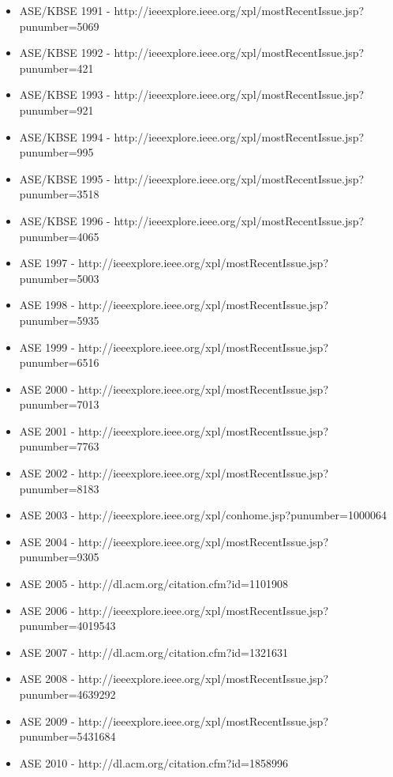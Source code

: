 \begin{itemize}
  \item ASE/KBSE 1991 - {\small http://ieeexplore.ieee.org/xpl/mostRecentIssue.jsp?punumber=5069}
  \item ASE/KBSE 1992 - {\small http://ieeexplore.ieee.org/xpl/mostRecentIssue.jsp?punumber=421}
  \item ASE/KBSE 1993 - {\small http://ieeexplore.ieee.org/xpl/mostRecentIssue.jsp?punumber=921}
  \item ASE/KBSE 1994 - {\small http://ieeexplore.ieee.org/xpl/mostRecentIssue.jsp?punumber=995}
  \item ASE/KBSE 1995 - {\small http://ieeexplore.ieee.org/xpl/mostRecentIssue.jsp?punumber=3518}
  \item ASE/KBSE 1996 - {\small http://ieeexplore.ieee.org/xpl/mostRecentIssue.jsp?punumber=4065}
  \item ASE 1997 - {\small http://ieeexplore.ieee.org/xpl/mostRecentIssue.jsp?punumber=5003}
  \item ASE 1998 - {\small http://ieeexplore.ieee.org/xpl/mostRecentIssue.jsp?punumber=5935}
  \item ASE 1999 - {\small http://ieeexplore.ieee.org/xpl/mostRecentIssue.jsp?punumber=6516}
  \item ASE 2000 - {\small http://ieeexplore.ieee.org/xpl/mostRecentIssue.jsp?punumber=7013}
  \item ASE 2001 - {\small http://ieeexplore.ieee.org/xpl/mostRecentIssue.jsp?punumber=7763}
  \item ASE 2002 - {\small http://ieeexplore.ieee.org/xpl/mostRecentIssue.jsp?punumber=8183}
  \item ASE 2003 - {\small http://ieeexplore.ieee.org/xpl/conhome.jsp?punumber=1000064}
  \item ASE 2004 - {\small http://ieeexplore.ieee.org/xpl/mostRecentIssue.jsp?punumber=9305}
  \item ASE 2005 - {\small http://dl.acm.org/citation.cfm?id=1101908}
  \item ASE 2006 - {\small http://ieeexplore.ieee.org/xpl/mostRecentIssue.jsp?punumber=4019543}
  \item ASE 2007 - {\small http://dl.acm.org/citation.cfm?id=1321631}
  \item ASE 2008 - {\small http://ieeexplore.ieee.org/xpl/mostRecentIssue.jsp?punumber=4639292}
  \item ASE 2009 - {\small http://ieeexplore.ieee.org/xpl/mostRecentIssue.jsp?punumber=5431684}
  \item ASE 2010 - {\small http://dl.acm.org/citation.cfm?id=1858996}

\end{itemize}
